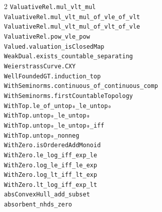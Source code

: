 \documentclass[10pt,a4paper]{article}
\begin{document}
\begin{multicols}{2}
\texttt{ValuativeRel.\allowbreak{}mul\_vlt\_mul} \\
\texttt{ValuativeRel.\allowbreak{}mul\_vlt\_mul\_of\_vle\_of\_vlt} \\
\texttt{ValuativeRel.\allowbreak{}mul\_vlt\_mul\_of\_vlt\_of\_vle} \\
\texttt{ValuativeRel.\allowbreak{}pow\_vle\_pow} \\
\texttt{Valued.\allowbreak{}valuation\_isClosedMap} \\
\texttt{WeakDual.\allowbreak{}exists\_countable\_separating} \\
\texttt{WeierstrassCurve.\allowbreak{}CXY} \\
\texttt{WellFoundedGT.\allowbreak{}induction\_top} \\
\texttt{WithSeminorms.\allowbreak{}continuous\_of\_continuous\_comp} \\
\texttt{WithSeminorms.\allowbreak{}firstCountableTopology} \\
\texttt{WithTop.\allowbreak{}le\_of\_untop₀\_le\_untop₀} \\
\texttt{WithTop.\allowbreak{}untop₀\_le\_untop₀} \\
\texttt{WithTop.\allowbreak{}untop₀\_le\_untop₀\_iff} \\
\texttt{WithTop.\allowbreak{}untop₀\_nonneg} \\
\texttt{WithZero.\allowbreak{}isOrderedAddMonoid} \\
\texttt{WithZero.\allowbreak{}le\_log\_iff\_exp\_le} \\
\texttt{WithZero.\allowbreak{}log\_le\_iff\_le\_exp} \\
\texttt{WithZero.\allowbreak{}log\_lt\_iff\_lt\_exp} \\
\texttt{WithZero.\allowbreak{}lt\_log\_iff\_exp\_lt} \\
\texttt{absConvexHull\_add\_subset} \\
\texttt{absorbent\_nhds\_zero} \\

\end{multicols}
\end{document}
